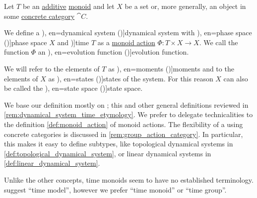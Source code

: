\begin{definition}\label{def:dynamical_system}\mimprovised
  Let \( T \) be an \hyperref[def:additive_semigroup]{additive} \hyperref[def:monoid]{monoid} and let \( X \) be a set or, more generally, an object in some \hyperref[def:concrete_category]{concrete category} \( \cat{C} \).

  We define a \term[ru=динамическая система (\cite[5]{Юмагулов2015ДинамическиеСистемы}), en=dynamical system (\cite[362]{Rozikov2012MultiDimensionalTimeDynamicalSystem})]{dynamical system} with \term[ru=фазовое пространство (\cite[5]{Юмагулов2015ДинамическиеСистемы}), en=phase space (\cite[362]{Rozikov2012MultiDimensionalTimeDynamicalSystem})]{phase space} \( X \) and \term[en=time (\cite[1]{HasselblattKatok1995DynamicalSystems})]{time} \( T \) as a \hyperref[def:monoid_action]{monoid action} \( \Phi: T \times X \to X \). We call the function \( \Phi \) an \term[ru=оператор эволюции (\cite[5]{Юмагулов2015ДинамическиеСистемы}), en=evolution function (\cite[362]{Rozikov2012MultiDimensionalTimeDynamicalSystem})]{evolution function}.

  We will refer to the elements of \( T \) as \term[ru=моменты (\cite[5]{Юмагулов2015ДинамическиеСистемы}), en=moments (\cite[2]{HasselblattKatok1995DynamicalSystems})]{moments} and to the elements of \( X \) as \term[ru=состояния (\cite[5]{Юмагулов2015ДинамическиеСистемы}), en=states (\cite[2]{HasselblattKatok1995DynamicalSystems})]{states} of the system. For this reason \( X \) can also be called the \term[ru=пространство состояний (\cite[5]{Юмагулов2015ДинамическиеСистемы}), en=state space (\cite[362]{Rozikov2012MultiDimensionalTimeDynamicalSystem})]{state space}.
\end{definition}
\begin{comments}
  \item We base our definition mostly on \cite[362]{Rozikov2012MultiDimensionalTimeDynamicalSystem}; this and other general definitions reviewed in \cref{rem:dynamical_system_time_etymology}. We prefer to delegate technicalities to the definition \cref{def:monoid_action} of monoid actions. The flexibility of a using concrete categories is discussed in \cref{rem:group_action_category}. In particular, this makes it easy to define subtypes, like topological dynamical systems in \cref{def:topological_dynamical_system}, or linear dynamical systems in \cref{def:linear_dynamical_system}.

  \item Unlike the other concepts, time monoids seem to have no established terminology. \Textcite[def. 1]{GiuntiMazzola2012DynamicalSystemsOnMonoids} suggest \enquote{time model}, however we prefer \enquote{time monoid} or \enquote{time group}.
\end{comments}

